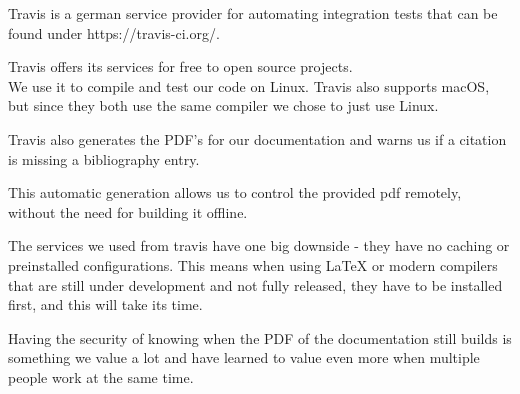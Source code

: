 Travis is a german service provider for automating integration tests that can be found under https://travis-ci.org/.

Travis offers its services for free to open source projects. \cite{travispricing} \\
We use it to compile and test our code on Linux. Travis also supports macOS, but since they both use the same compiler we chose to just use Linux.  

Travis also generates the PDF's for our documentation and warns us if a citation is missing a bibliography entry.  

This automatic generation allows us to control the provided pdf remotely, without the need for building it offline.

The services we used from travis have one big downside - they have no caching or preinstalled configurations. This means when using LaTeX or modern compilers that are still under development and not fully released, they have to be installed first, and this will take its time.

Having the security of knowing when the PDF of the documentation still builds is something we value a lot and have learned to value even more when multiple people work at the same time.